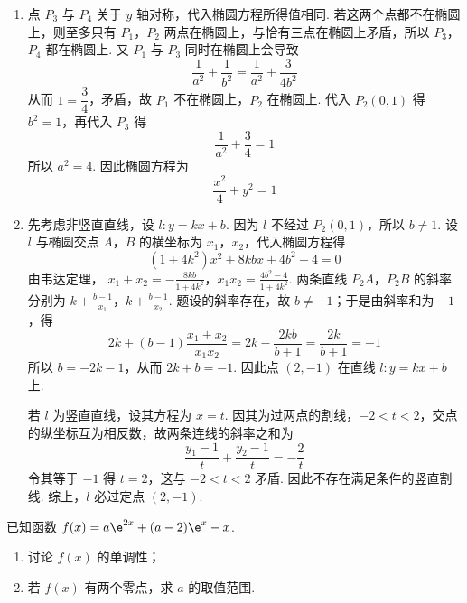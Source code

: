 \begin{solution}
\begin{enumerate}
\item 点 \(P_3\) 与 \(P_4\) 关于 \(y\) 轴对称，代入椭圆方程所得值相同. 若这两个点都不在椭圆上，则至多只有 \(P_1\)，\(P_2\) 两点在椭圆上，与恰有三点在椭圆上矛盾，所以 \(P_3\)，\(P_4\) 都在椭圆上. 又 \(P_1\) 与 \(P_3\) 同时在椭圆上会导致
\[
\frac1{a^2}+\frac1{b^2}
=\frac1{a^2}+\frac{3}{4b^2}
\]
从而 \(1=\dfrac34\)，矛盾，故 \(P_1\) 不在椭圆上，\(P_2\) 在椭圆上. 代入 \(P_2(0,1)\) 得 \(b^2=1\)，再代入 \(P_3\) 得
\[
\frac1{a^2}+\frac34=1
\]
所以 \(a^2=4\). 因此椭圆方程为
\[
\frac{x^2}{4}+y^2=1
\]

\item 先考虑非竖直直线，设 \(l:y=kx+b\). 因为 \(l\) 不经过 \(P_2(0,1)\)，所以 \(b\ne1\). 设 \(l\) 与椭圆交点 \(A\)，\(B\) 的横坐标为 \(x_1\)，\(x_2\)，代入椭圆方程得
\[
(1+4k^2)x^2+8kbx+4b^2-4=0
\]
由韦达定理，
\(x_1+x_2=-\frac{8kb}{1+4k^2}\)，\(x_1x_2=\frac{4b^2-4}{1+4k^2}\).
两条直线 \(P_2A\)，\(P_2B\) 的斜率分别为
\(k+\frac{b-1}{x_1}\)，\(k+\frac{b-1}{x_2}\).
题设的斜率存在，故 \(b\ne-1\)；于是由斜率和为 \(-1\)，得
\[
2k+(b-1)\frac{x_1+x_2}{x_1x_2}
=2k-\frac{2kb}{b+1}
=\frac{2k}{b+1}
=-1
\]
所以 \(b=-2k-1\)，从而 \(2k+b=-1\). 因此点 \((2,-1)\) 在直线 \(l:y=kx+b\) 上.

若 \(l\) 为竖直直线，设其方程为 \(x=t\). 因其为过两点的割线，\(-2<t<2\)，交点的纵坐标互为相反数，故两条连线的斜率之和为
\[
\frac{y_1-1}{t}+\frac{y_2-1}{t}=-\frac2t
\]
令其等于 \(-1\) 得 \(t=2\)，这与 \(-2<t<2\) 矛盾. 因此不存在满足条件的竖直割线. 综上，\(l\) 必过定点 \((2,-1)\).
\end{enumerate}
\end{solution}

\begin{problem}
已知函数 \(f(x)=a\e^{2x}+(a-2)\e^x-x\).

\begin{enumerate}
\item 讨论 \(f(x)\) 的单调性；
\item 若 \(f(x)\) 有两个零点，求 \(a\) 的取值范围.
\end{enumerate}
\end{problem}

